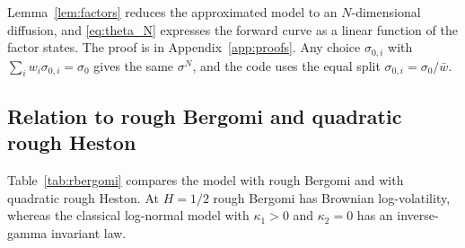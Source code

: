 Lemma~\ref{lem:factors} reduces the approximated model to an $N$-dimensional diffusion, and \eqref{eq:theta_N} expresses the forward curve as a linear function of the factor states. The proof is in Appendix~\ref{app:proofs}. Any choice $\sigma_{0,i}$ with $\sum_i w_i\sigma_{0,i}=\sigma_0$ gives the same $\sigma^N$, and the code uses the equal split $\sigma_{0,i}=\sigma_0/\bar w$.


\subsection{Relation to rough Bergomi and quadratic rough Heston}

Table~\ref{tab:rbergomi} compares the model with rough Bergomi and with quadratic rough Heston. At $H=1/2$ rough Bergomi has Brownian log-volatility, whereas the classical log-normal model with $\kappa_1>0$ and $\kappa_2=0$ has an inverse-gamma invariant law.


